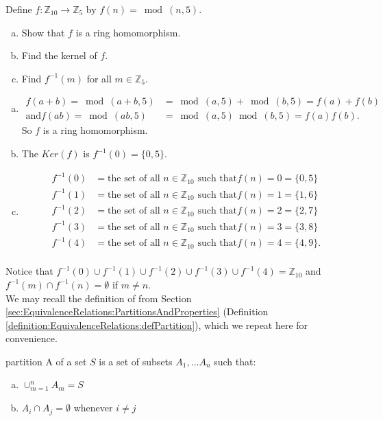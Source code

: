 \begin{example}{}
Define $f: {\mathbb Z}_{10}\rightarrow {\mathbb Z}_5$ by $f(n)=\bmod(n,5)$.
\begin{enumerate}[(a)]
\item Show that $f$ is a ring homomorphism.
\item Find the kernel of $f$.
\item Find $f^{-1}(m)$ for all $m\in{\mathbb Z}_5$.
\end{enumerate}

\begin{enumerate}[(a)]
\item 
\begin{align*}
f(a+b)=\bmod(a+b,5)&=\bmod(a,5)+\bmod(b,5)=f(a)+f(b) \\
\text{and} f(ab)=\bmod(ab,5)&=\bmod(a,5)\bmod(b,5)=f(a)f(b).
\end{align*}
So $f$ is a ring homomorphism.

\item The $Ker(f)$ is $f^{-1}(0)=\{0,5\}$.\\

\item
\begin{align*}
f^{-1}(0)&=\text{the set of all $n\in{\mathbb Z}_{10}$ such that} f(n)=0=\{0,5\} \\
f^{-1}(1)&=\text{the set of all $n\in{\mathbb Z}_{10}$ such that} f(n)=1=\{1,6\} \\
f^{-1}(2)&=\text{the set of all $n\in{\mathbb Z}_{10}$ such that} f(n)=2=\{2,7\} \\
f^{-1}(3)&=\text{the set of all $n\in{\mathbb Z}_{10}$ such that} f(n)=3=\{3,8\} \\
f^{-1}(4)&=\text{the set of all $n\in{\mathbb Z}_{10}$ such that} f(n)=4=\{4,9\}. \\
\end{align*}
\end{enumerate}

Notice that $f^{-1}(0)\cup f^{-1}(1)\cup f^{-1}(2)\cup f^{-1}(3)\cup f^{-1}(4)={\mathbb Z}_{10}$ and $f^{-1}(m)\cap f^{-1}(n)=\emptyset$ if $m\neq n$.\\
We may recall the definition of  from Section \ref{sec:EquivalenceRelations:PartitionsAndProperties} 
(Definition \ref{definition:EquivalenceRelations:defPartition}), which we repeat here for convenience.

\begin{defn}{partition}
A  of a set $S$ is a set of subsets $A_1,\dots A_n$ such that:
\begin{enumerate}[(a)]
\item $\cup_{m=1}^n A_m=S$
\item $A_i\cap A_j=\emptyset$ whenever $i\neq j$
\end{enumerate}
\end{defn}


\end{example}
